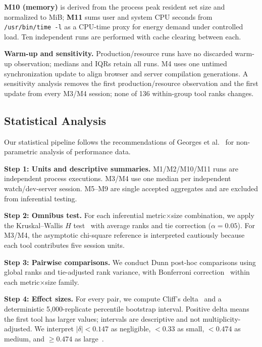 \documentclass[preprint,12pt]{elsarticle}
\begin{document}
\textbf{M10 (memory)} is derived from the process peak resident set size and normalized to MiB; \textbf{M11} sums user and system CPU seconds from \texttt{/usr/bin/time -l} as a CPU-time proxy for energy demand under controlled load.
Ten independent runs are performed with cache clearing between each.

\textbf{Warm-up and sensitivity.} Production/resource runs have no discarded warm-up observation; medians and IQRs retain all runs. M4 uses one untimed synchronization update to align browser and server compilation generations. A sensitivity analysis removes the first production/resource observation and the first update from every M3/M4 session; none of 136 within-group tool ranks changes.

\subsection{Statistical Analysis}\label{sec:stats}

Our statistical pipeline follows the recommendations of Georges et al.~\cite{georges2007statistically} for non-parametric analysis of performance data.

\textbf{Step 1: Units and descriptive summaries.}
M1/M2/M10/M11 runs are independent process executions. M3/M4 use one median per independent watch/dev-server session. M5--M9 are single accepted aggregates and are excluded from inferential testing.

\textbf{Step 2: Omnibus test.}
For each inferential metric$\times$size combination, we apply the Kruskal--Wallis $H$ test~\cite{kruskal1952use} with average ranks and tie correction ($\alpha = 0.05$).
For M3/M4, the asymptotic chi-square reference is interpreted cautiously because each tool contributes five session units.

\textbf{Step 3: Pairwise comparisons.}
We conduct Dunn post-hoc comparisons using global ranks and tie-adjusted rank variance, with Bonferroni correction~\cite{bonferroni1936teoria} within each metric$\times$size family.

\textbf{Step 4: Effect sizes.}
For every pair, we compute Cliff's delta~\cite{cliff1993dominance} and a deterministic 5{,}000-replicate percentile bootstrap interval.
Positive delta means the first tool has larger values; intervals are descriptive and not multiplicity-adjusted.
We interpret $|\delta| < 0.147$ as negligible, $< 0.33$ as small, $< 0.474$ as medium, and $\geq 0.474$ as large~\cite{vargha2000critique}.
\end{document}
